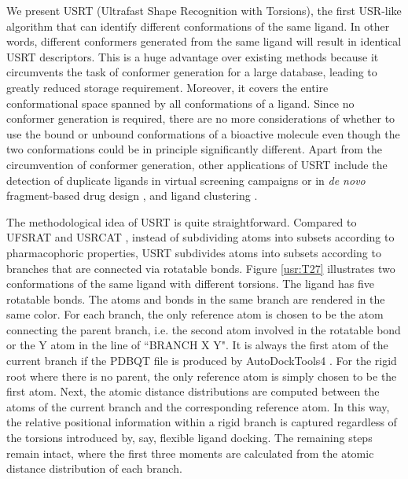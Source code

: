 We present USRT (Ultrafast Shape Recognition with Torsions), the first USR-like algorithm that can identify different conformations of the same ligand. In other words, different conformers generated from the same ligand will result in identical USRT descriptors. This is a huge advantage over existing methods because it circumvents the task of conformer generation for a large database, leading to greatly reduced storage requirement. Moreover, it covers the entire conformational space spanned by all conformations of a ligand. Since no conformer generation is required, there are no more considerations of whether to use the bound or unbound conformations of a bioactive molecule even though the two conformations could be in principle significantly different. Apart from the circumvention of conformer generation, other applications of USRT include the detection of duplicate ligands in virtual screening campaigns \citep{1390} or in \textit{de novo} fragment-based drug design \citep{1409,1387}, and ligand clustering \citep{1280,1332}.

The methodological idea of USRT is quite straightforward. Compared to UFSRAT \citep{1436} and USRCAT \citep{1331}, instead of subdividing atoms into subsets according to pharmacophoric properties, USRT subdivides atoms into subsets according to branches that are connected via rotatable bonds. Figure \ref{usr:T27} illustrates two conformations of the same ligand with different torsions. The ligand has five rotatable bonds. The atoms and bonds in the same branch are rendered in the same color. For each branch, the only reference atom is chosen to be the atom connecting the parent branch, i.e. the second atom involved in the rotatable bond or the Y atom in the line of ``BRANCH X Y". It is always the first atom of the current branch if the PDBQT file is produced by AutoDockTools4 \citep{596}. For the rigid root where there is no parent, the only reference atom is simply chosen to be the first atom. Next, the atomic distance distributions are computed between the atoms of the current branch and the corresponding reference atom. In this way, the relative positional information within a rigid branch is captured regardless of the torsions introduced by, say, flexible ligand docking. The remaining steps remain intact, where the first three moments are calculated from the atomic distance distribution of each branch.

